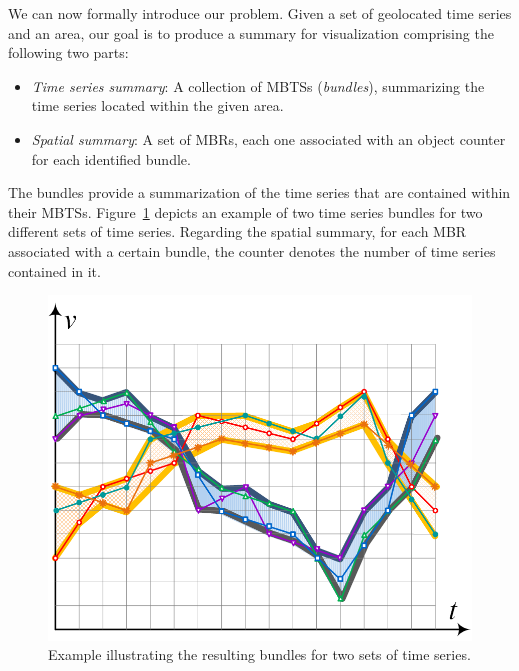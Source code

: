
We can now formally introduce our problem. Given a set of geolocated time series and an area, our goal is to produce a summary for visualization comprising the following two parts: 

\begin{itemize}
	\item \emph{Time series summary}: A collection of MBTSs (\emph{bundles}), summarizing the time series located within the given area.
	\item \emph{Spatial summary}: A set of MBRs, each one associated with an object counter for each identified bundle.
\end{itemize}
	
The bundles provide a summarization of the time series that are contained within their MBTSs. Figure~\ref{fig:example_bundle} depicts an example of two time series bundles for two different sets of time series. Regarding the spatial summary, for each MBR associated with a certain bundle, the counter denotes the number of time series contained in it.

\begin{figure}[!ht]
	\centering
	\includegraphics[width=0.8\columnwidth]{figures/bounds_ctsr.png}
	\caption{Example illustrating the resulting bundles for two sets of time series.}
	\label{fig:example_bundle}
\end{figure}


